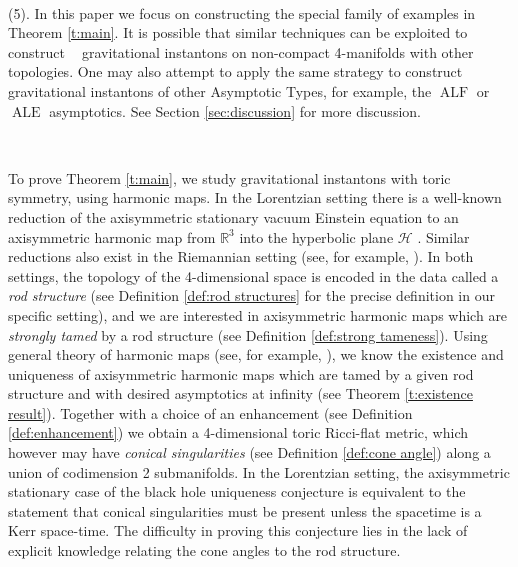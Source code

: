 \documentclass[a4paper,11pt]{amsart}
\theoremstyle{definition}
\numberwithin{equation}{section}
\DeclareMathOperator{\ALF}{ALF}
\DeclareMathOperator{\ALE}{ALE}
\DeclareMathOperator{\AFa}{AF_\beta}
\begin{document}
\

(5). In this paper we focus on constructing the special family of examples in Theorem \ref{t:main}. It is possible that similar techniques can be exploited to construct $\AFa$ gravitational instantons on non-compact 4-manifolds with other  topologies. One may also attempt to apply the same strategy  to construct gravitational instantons of other Asymptotic Types, for example, the $\ALF$ or $\ALE$ asymptotics. See Section \ref{sec:discussion} for more discussion.

\


To prove Theorem \ref{t:main}, we study gravitational instantons with toric symmetry, using harmonic maps. In the Lorentzian setting there is a well-known reduction of the axisymmetric stationary vacuum Einstein equation to an axisymmetric harmonic map from $\mathbb R^3$ into the hyperbolic plane $\mathcal H$ \cite{MM, Ernst, Carter, BZ, WS}. Similar reductions also exist in the Riemannian setting (see, for example, \cite{Lott, Kunduri}). In both settings, the topology of the 4-dimensional space is encoded in the data called a \emph{rod structure} (see Definition \ref{def:rod structures} for the precise definition in our specific setting), and we are interested in axisymmetric harmonic maps which are \emph{strongly tamed} by a rod structure (see Definition \ref{def:strong tameness}). Using  general theory of harmonic maps (see, for example, \cite{Weinstein,  Kunduri}), we know the existence and uniqueness of axisymmetric harmonic maps which are tamed by a given rod structure and with desired asymptotics at infinity (see  Theorem \ref{t:existence result}). Together with a choice of an enhancement (see Definition \ref{def:enhancement}) we obtain a 4-dimensional toric Ricci-flat metric, which however may have \emph{conical singularities} (see Definition \ref{def:cone angle}) along a union of  codimension 2 submanifolds. In the Lorentzian setting, the axisymmetric stationary case of the black hole uniqueness conjecture is equivalent to the statement that conical singularities must be present unless the spacetime is a Kerr space-time. The difficulty in proving this conjecture lies in the lack of explicit knowledge relating the cone angles to the rod structure.  

\
\end{document}
